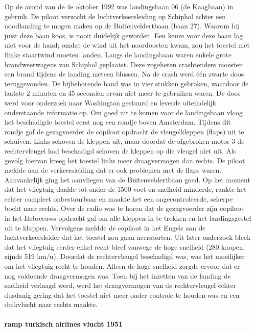 Op de avond van de 4e oktober 1992 was landingsbaan 06 (de Kaagbaan) in gebruik. De piloot verzocht de luchtverkeersleiding op Schiphol echter een noodlanding te mogen maken op de Buitenveldertbaan (baan 27). Waarom hij juist deze baan koos, is nooit duidelijk geworden. Een keuze voor deze baan lag niet voor de hand; omdat de wind uit het noordoosten kwam, zou het toestel met flinke staartwind moeten landen. Langs de landingsbaan waren enkele grote brandweerwagens van Schiphol geplaatst. Deze zogeheten crashtenders moesten een brand tijdens de landing meteen blussen. Na de crash werd één zwarte doos teruggevonden. De bijbehorende band was in vier stukken gebroken, waardoor de laatste 2 minuten en 45 seconden ervan niet meer te gebruiken waren. De doos werd voor onderzoek naar Washington gestuurd en leverde uiteindelijk onderstaande informatie op.
Om goed uit te komen voor de landingsbaan vloog het beschadigde toestel eerst nog een rondje boven Amsterdam. Tijdens dit rondje gaf de gezagvoerder de copiloot opdracht de vleugelkleppen (flaps) uit te schuiven. Links schoven de kleppen uit, maar doordat de afgebroken motor 3 de rechtervleugel had beschadigd schoven de kleppen op die vleugel niet uit. Als gevolg hiervan kreeg het toestel links meer draagvermogen dan rechts. De piloot meldde aan de verkeersleiding dat er ook problemen met de flaps waren.
Aanvankelijk ging het aanvliegen van de Buitenveldertbaan goed. Op het moment dat het vliegtuig daalde tot onder de 1500 voet en snelheid minderde, raakte het echter compleet onbestuurbaar en maakte het een ongecontroleerde, scherpe bocht naar rechts. Over de radio was te horen dat de gezagvoerder zijn copiloot in het Hebreeuws opdracht gaf om alle kleppen in te trekken en het landingsgestel uit te klappen. Vervolgens meldde de copiloot in het Engels aan de luchtverkeersleider dat het toestel zou gaan neerstorten. Uit later onderzoek bleek dat het vliegtuig eerder enkel recht bleef vanwege de hoge snelheid (280 knopen, zijnde 519 km/u). Doordat de rechtervleugel beschadigd was, was het moeilijker om het vliegtuig recht te houden. Alleen de hoge snelheid zorgde ervoor dat er nog voldoende draagvermogen was. Toen bij het inzetten van de landing de snelheid verlaagd werd, werd het draagvermogen van de rechtervleugel echter dusdanig gering dat het toestel niet meer onder controle te houden was en een duikvlucht naar rechts maakte.

\cite{aviationsafety04101992airplaneCrashBijlmer}

\paragraph{ramp turkisch airlines vlucht 1951}


